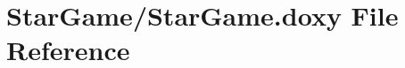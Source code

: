 \hypertarget{_star_game_8doxy}{\section{Star\-Game/\-Star\-Game.doxy File Reference}
\label{_star_game_8doxy}
}
